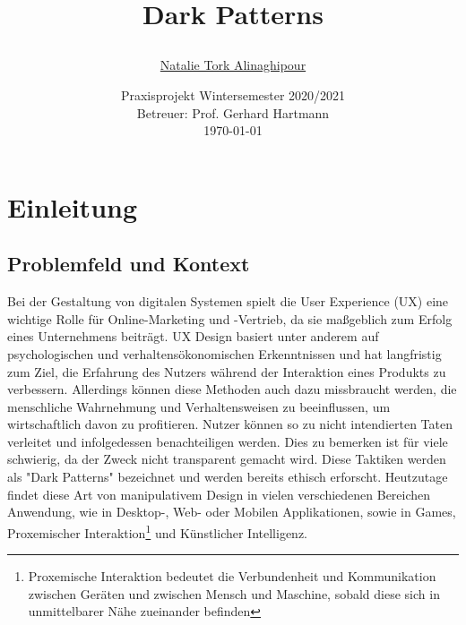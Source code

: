 \documentclass[a4paper]{article}
\begin{document}
	\title{
	\begin{figure}[!ht]
	\end{figure}
	\vspace{1cm}
	\Huge Dark Patterns
	}
	
	\vspace{1cm}

	

	\author{\Large \href{mailto:natalie.tork_alinaghipour@smail.th-koeln.de}{Natalie Tork Alinaghipour} 
	\vspace{1cm}}
	
	\date{
	\large Praxisprojekt Wintersemester 2020/2021 \\ 
	\vspace{0.8cm}
	\large Betreuer: Prof. Gerhard Hartmann \\
	\vspace{1cm}
	\today
	}

	\maketitle
	\setlength{\parindent}{0pt}

\vspace{2cm}
\begin{abstract}


\end{abstract}
	\newpage
	\tableofcontents
	\newpage
	
\section{Einleitung} 
\label{sec:einleitung}

\subsection{Problemfeld und Kontext}
\label{sub:problemfeld_und_kontext}
Bei der Gestaltung von digitalen Systemen spielt die User Experience (UX) eine wichtige Rolle für Online-Marketing und -Vertrieb, da sie maßgeblich zum Erfolg eines Unternehmens beiträgt. UX Design basiert unter anderem auf psychologischen und verhaltensökonomischen Erkenntnissen und hat langfristig zum Ziel, die Erfahrung des Nutzers während der Interaktion eines Produkts zu verbessern. Allerdings können diese Methoden auch dazu missbraucht werden, die menschliche Wahrnehmung und Verhaltensweisen zu beeinflussen, um wirtschaftlich davon zu profitieren. Nutzer können so zu nicht intendierten Taten verleitet und infolgedessen benachteiligen werden. Dies zu bemerken ist für viele schwierig, da der Zweck nicht transparent gemacht wird.
Diese Taktiken werden als "Dark Patterns" bezeichnet und werden bereits ethisch erforscht. Heutzutage findet diese Art von manipulativem Design in vielen verschiedenen Bereichen Anwendung, wie in Desktop-, Web- oder Mobilen Applikationen, sowie in Games, Proxemischer Interaktion\footnote{\label{foot:1} Proxemische Interaktion bedeutet die Verbundenheit und Kommunikation zwischen Geräten und zwischen Mensch und Maschine, sobald diese sich in unmittelbarer Nähe zueinander befinden} und Künstlicher Intelligenz. 
\end{document}
